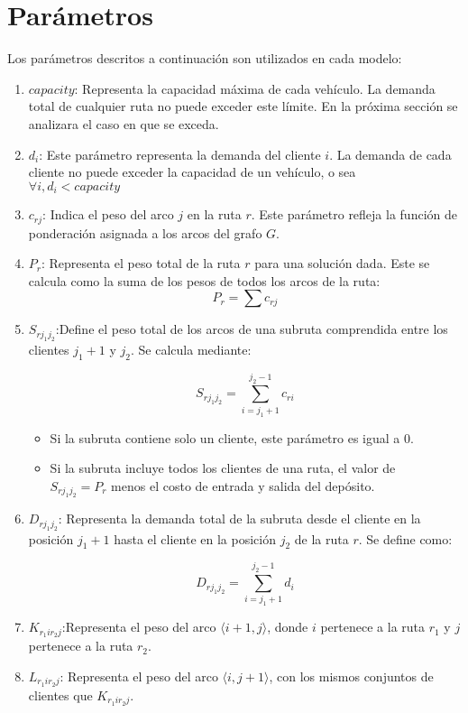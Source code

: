 \documentclass{article}
\begin{document}
\section{Parámetros}

Los parámetros descritos a continuación son utilizados en cada modelo:

\begin{enumerate}
\item{$capacity$: Representa la capacidad máxima de cada vehículo. La demanda total de cualquier ruta no puede exceder este límite. En la próxima sección se analizara el caso en que se exceda.}
\item{$d_i$: Este parámetro representa la demanda del cliente $i$. La demanda de cada cliente no puede exceder la capacidad de un vehículo, o sea \\ $\forall {i}, d_i < capacity$ }
\item{$c_{rj}$: Indica el peso del arco $j$ en la ruta $r$. Este parámetro refleja la función de ponderación asignada a los arcos del grafo $G$.}


\item{$P_r$: Representa el peso total de la ruta $r$ para una solución dada. Este se calcula como la suma de los pesos de todos los arcos de la ruta:}
  \[
P_r=\sum c_{rj}  
\]

\item{$S_{rj_1j_2}$:Define el peso total de los arcos de una subruta comprendida entre los clientes $j_1+1$ y $j_2$. Se calcula mediante:}

\[
S_{rj_1j_2}=\sum\limits_{i=j_1+1}^{j_2-1} c_{ri} 
\]
\begin{itemize}
\item
Si la subruta contiene solo un cliente, este parámetro es igual a 0.
\item
Si la subruta incluye todos los clientes de una ruta, el valor de \\ $S_{rj_1j_2} = P_r$  menos el costo de entrada y salida del depósito.
\end{itemize}

\item {$D_{rj_1j_2}$: Representa la demanda total de la subruta desde el cliente en la posición $j_1+1$ hasta el cliente en la posición $j_2$ de la ruta $r$. Se define como:}

\[
D_{rj_1j_2}=\sum\limits_{i=j_1+1}^{j_2-1} d_i 
\]
\item{$K_{r_1ir_2j}$:Representa el peso del arco $\langle i+1, j \rangle$, donde $i$ pertenece a la ruta $r_1$ y $j$ pertenece a la ruta $r_2$.}
\item{$L_{r_1ir_2j}$: Representa el peso del arco $\langle i, j+1 \rangle$, con los mismos conjuntos de clientes que $K_{r_1ir_2j}$.}\\


\end{enumerate}
\end{document}
